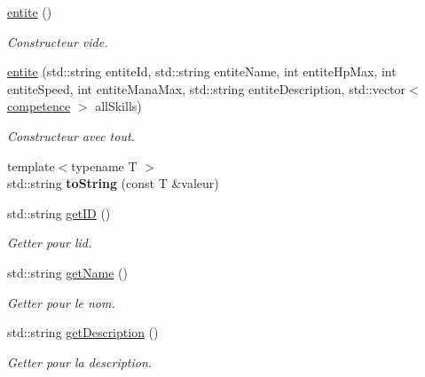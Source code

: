 \begin{DoxyCompactItemize}
\item 
\mbox{\label{classentite_a41b83303ba28a228fdfad7de3eed40fe}} 
\hyperlink{classentite_a41b83303ba28a228fdfad7de3eed40fe}{entite} ()
\begin{DoxyCompactList}\small\item\em Constructeur vide. \end{DoxyCompactList}\item 
\hyperlink{classentite_a5e655b5c1999ae75dfca0b32de737b1e}{entite} (std\+::string entite\+Id, std\+::string entite\+Name, int entite\+Hp\+Max, int entite\+Speed, int entite\+Mana\+Max, std\+::string entite\+Description, std\+::vector$<$ \hyperlink{classcompetence}{competence} $>$ all\+Skills)
\begin{DoxyCompactList}\small\item\em Constructeur avec tout. \end{DoxyCompactList}\item 
\mbox{\label{classentite_ab77d3864b5cfed8364816e27b9eb7077}} 
{\footnotesize template$<$typename T $>$ }\\std\+::string {\bfseries to\+String} (const T \&valeur)
\item 
\mbox{\label{classentite_a3af765474e7f288752f24334d0fc6bbd}} 
std\+::string \hyperlink{classentite_a3af765474e7f288752f24334d0fc6bbd}{get\+ID} ()
\begin{DoxyCompactList}\small\item\em Getter pour l\textquotesingle{}id. \end{DoxyCompactList}\item 
\mbox{\label{classentite_a0ebd43d682f234a39faa04bb34173d03}} 
std\+::string \hyperlink{classentite_a0ebd43d682f234a39faa04bb34173d03}{get\+Name} ()
\begin{DoxyCompactList}\small\item\em Getter pour le nom. \end{DoxyCompactList}\item 
\mbox{\label{classentite_ab19b8d18b4d947c85063b2225bbb9144}} 
std\+::string \hyperlink{classentite_ab19b8d18b4d947c85063b2225bbb9144}{get\+Description} ()
\begin{DoxyCompactList}\small\item\em Getter pour la description. \end{DoxyCompactList}\item 

\end{DoxyCompactItemize}

